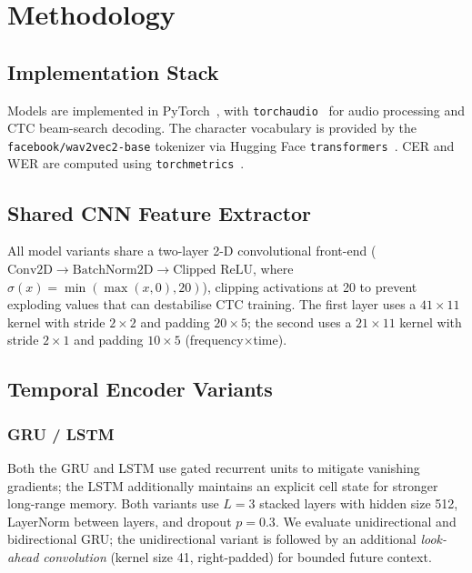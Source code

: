 \section{Methodology}

\subsection{Implementation Stack}

Models are implemented in PyTorch~\cite{paszke2019pytorch}, with \texttt{torchaudio}~\cite{hwang2023torchaudio}
for audio processing and CTC beam-search decoding. The character vocabulary is provided by the
\texttt{facebook/wav2vec2-base} tokenizer via Hugging Face \texttt{transformers}~\cite{wolf-etal-2020-transformers}.
CER and WER are computed using \texttt{torchmetrics}~\cite{Detlefsen2022}.

\subsection{Shared CNN Feature Extractor}
\label{sec:cnn}

All model variants share a two-layer 2-D convolutional front-end
(\(\text{Conv2D} \to \text{BatchNorm2D} \to \text{Clipped ReLU}\), where
\(\sigma(x) = \min(\max(x,0),20)\)), clipping activations at 20 to prevent exploding
values that can destabilise CTC training.
The first layer uses a \(41\times11\) kernel with stride \(2\times2\) and padding \(20\times5\);
the second uses a \(21\times11\) kernel with stride \(2\times1\) and padding \(10\times5\)
(frequency\(\times\)time).

\subsection{Temporal Encoder Variants}

\subsubsection{GRU / LSTM}

Both the GRU and LSTM use gated recurrent units to mitigate vanishing gradients; the LSTM additionally maintains an explicit cell state for stronger long-range memory.
Both variants use \(L=3\) stacked layers with hidden size 512, LayerNorm between layers, and dropout \(p=0.3\).
We evaluate unidirectional and bidirectional GRU; the unidirectional variant is followed by an additional \emph{look-ahead convolution} (kernel size 41, right-padded) for bounded future context.

